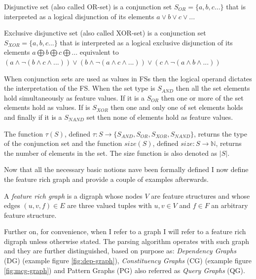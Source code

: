 \begin{definition}\label{def:or-set}
	Disjunctive set (also called OR-set) is a conjunction set $S_{OR}=\{a,b,c...\}$ that is interpreted as a logical disjunction of its elements $a \vee b \vee c \vee ...$
\end{definition}

\begin{definition}\label{def:xor-set}
	Exclusive disjunctive set (also called XOR-set) is a conjunction set $S_{XOR}=\{a,b,c...\}$ that is interpreted as a logical exclusive disjunction of its elements $a \bigoplus b \bigoplus c \bigoplus ...$ equivalent to $ (a \wedge \neg (b \wedge c \wedge ... )) \vee (b \wedge \neg (a \wedge c \wedge ...)) \vee (c \wedge \neg (a \wedge b \wedge ...)) $
\end{definition}

When conjunction sets are used as values in FSs then the logical operand dictates the interpretation of the FS. When the set type is $S_{AND}$ then all the set elements hold simultaneously as feature values. If it is a $S_{OR}$ then one or more of the set elements hold as values. If is $S_{XOR}$ then one and only one of set elements holds and finally if it is a $S_{NAND}$ set then none of elements hold as feature values.

The function $\tau(S)$, defined $\tau:S \rightarrow \{S_{AND},S_{OR},S_{XOR},S_{NAND} \}$, returns the type of the conjunction set and the function $size(S)$, defined $size:S \rightarrow \mathbb{N}$, returns the number of elements in the set. The size function is also denoted as $|S|$.
 
Now that all the necessary basic notions nave been formally defined I now define the feature rich graph and provide a couple of examples afterwards. 
 
\begin{definition}\label{def:feature-rich-graph}
	A \textit{feature rich graph} is a digraph whose nodes $V$ are feature structures and whose edges $(u,v,f) \in E$ are three valued tuples with $ u,v \in V$ and $f \in F$ an arbitrary feature structure.
\end{definition}

Further on, for convenience, when I refer to a graph I will refer to a feature rich digraph unless otherwise stated. The parsing algorithm operates with such graph and they are further distinguished, based on purpose as: \textit{Dependency Graphs} (DG) (example figure \ref{fig:dep-graph}), \textit{Constituency Graphs} (CG) (example figure \ref{fig:mcg-graph}) and Pattern Graphs (PG) also referred as \textit{Query Graphs} (QG).

